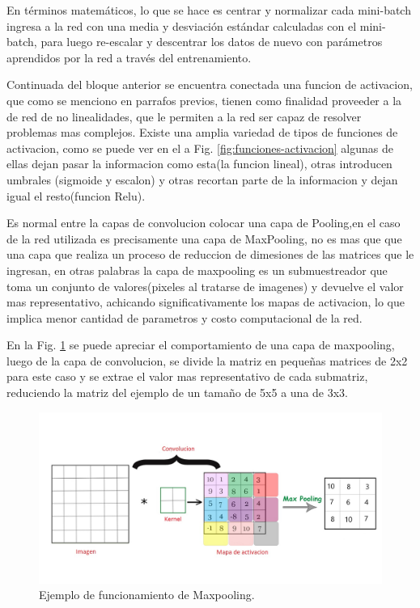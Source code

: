 En términos matemáticos, lo que se hace es centrar y normalizar cada mini-batch ingresa a la red con una media y 
desviación estándar calculadas con el mini-batch, para luego re-escalar y descentrar los datos de nuevo con parámetros 
aprendidos por la red a través del entrenamiento.

Continuada del bloque anterior se encuentra conectada una funcion de activacion, que como se menciono en parrafos previos, tienen como finalidad 
proveeder a la de red de no linealidades, que le permiten a la red ser capaz de resolver problemas mas complejos. Existe una amplia variedad 
de tipos de funciones de activacion, como se puede ver en el a Fig. \ref{fig:funciones-activacion} algunas de ellas dejan pasar la informacion
como esta(la funcion lineal), otras introducen umbrales (sigmoide y escalon) y otras recortan parte de la informacion y dejan igual el resto(funcion Relu).

Es normal entre la capas de convolucion colocar una capa de Pooling,en el caso de la red utilizada es precisamente una capa de MaxPooling,
no es mas que que una capa que realiza un proceso de reduccion de dimesiones de las matrices que le ingresan, en otras palabras la capa de maxpooling 
es un submuestreador que toma un conjunto de valores(pixeles al tratarse de imagenes) y devuelve el valor mas representativo, achicando significativamente 
los mapas de activacion, lo que implica menor cantidad de parametros y costo computacional de la red.

En la Fig. \ref{fig:ejemplo-mp} se puede apreciar el comportamiento de una capa de maxpooling, luego de la capa de convolucion, se divide la matriz
en pequeñas matrices de 2x2 para este caso y se extrae el valor mas representativo de cada submatriz, reduciendo la matriz del ejemplo de un tamaño de 
5x5 a una de 3x3.
\begin{figure}
    \centering
    \includegraphics[width=1\textwidth]{imgs/ej-maxpooling.jpg}
    \caption{Ejemplo de funcionamiento de Maxpooling.}
    \label{fig:ejemplo-mp}
\end{figure}
 

